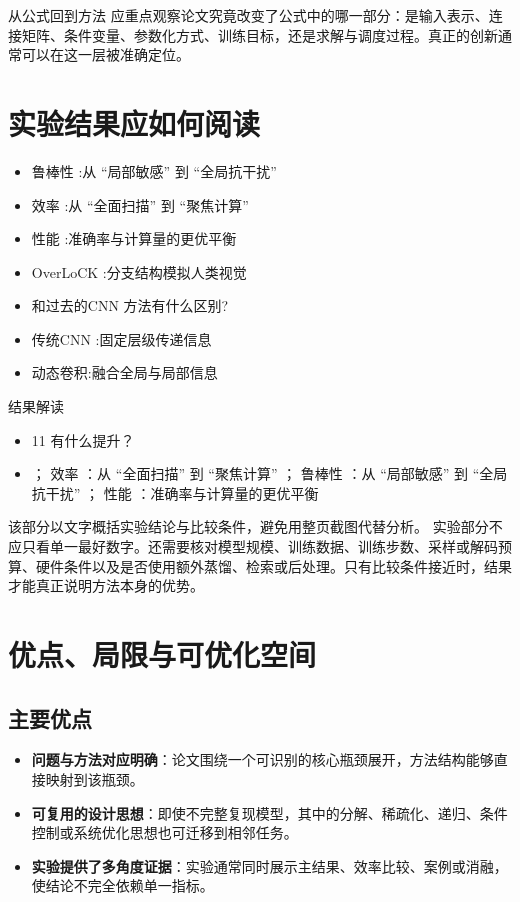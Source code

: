 \documentclass[UTF8,11pt,a4paper]{ctexart}
\newcommand{\term}[1]{\textbf{\textcolor{mainblue}{#1}}}
\begin{document}
\begin{keybox}{从公式回到方法}
应重点观察论文究竟改变了公式中的哪一部分：是输入表示、连接矩阵、条件变量、参数化方式、训练目标，还是求解与调度过程。真正的创新通常可以在这一层被准确定位。
\end{keybox}


\section{实验结果应如何阅读}
\begin{itemize}
\item 鲁棒性 :从 “局部敏感” 到 “全局抗干扰”
\item 效率 :从 “全面扫描” 到 “聚焦计算”
\item 性能 :准确率与计算量的更优平衡
\item OverLoCK :分支结构模拟人类视觉
\item 和过去的CNN 方法有什么区别?
\item 传统CNN :固定层级传递信息
\item 动态卷积:融合全局与局部信息
\end{itemize}

\begin{notebox}{结果解读}
\begin{itemize}
\item 11 有什么提升？
\item ； 效率 ：从 “全面扫描” 到 “聚焦计算” ； 鲁棒性 ：从 “局部敏感” 到 “全局抗干扰” ； 性能 ：准确率与计算量的更优平衡
\end{itemize}
\end{notebox}

该部分以文字概括实验结论与比较条件，避免用整页截图代替分析。
实验部分不应只看单一最好数字。还需要核对模型规模、训练数据、训练步数、采样或解码预算、硬件条件以及是否使用额外蒸馏、检索或后处理。只有比较条件接近时，结果才能真正说明方法本身的优势。

\section{优点、局限与可优化空间}
\subsection{主要优点}
\begin{itemize}
\item \term{问题与方法对应明确}：论文围绕一个可识别的核心瓶颈展开，方法结构能够直接映射到该瓶颈。
\item \term{可复用的设计思想}：即使不完整复现模型，其中的分解、稀疏化、递归、条件控制或系统优化思想也可迁移到相邻任务。
\item \term{实验提供了多角度证据}：实验通常同时展示主结果、效率比较、案例或消融，使结论不完全依赖单一指标。
\end{itemize}
\end{document}
